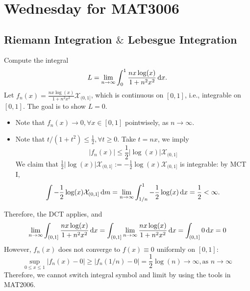 
\section{Wednesday for MAT3006}
\subsection{Riemann Integration $\&$ Lebesgue Integration}
\begin{example}
Compute the integral
\[
L=\lim_{n\to\infty}\int_0^1\frac{nx\log(x)}{1+n^2x^2}\,\mathrm{d} x.
\]
Let $f_n(x) = \frac{nx\log(x)}{1+n^2x^2}\mathcal{X}_{(0,1]}$, which is continuous on $[0,1]$, i.e., integrable on $[0,1]$.
The goal is to show $L=0$.
\begin{itemize}
\item
Note that $f_n(x)\to0,\forall x\in[0,1]$ pointwisely, as $n\to\infty$.
\item
Note that $t/(1+t^2)\le\frac{1}{2},\forall t\ge0$. Take $t=nx$, we imply
\[
|f_n(x)| \le\frac{1}{2}|\log(x)|\mathcal{X}_{(0,1]}
\]
We claim that $\frac{1}{2}|\log(x)|\mathcal{X}_{(0,1]}:=-\frac{1}{2}\log(x)\mathcal{X}_{(0,1]}$ is integrable:
by MCT I,
\[
\int-\frac{1}{2}\log(x)\mathcal{X}_{(0,1]}\,\mathrm{d} m
=
\lim_{n\to\infty}\int_{1/n}^1-\frac{1}{2}\log(x)\,\mathrm{d} x
=\frac{1}{2}<\infty.
\]
\end{itemize}
Therefore, the DCT applies, and
\[
\lim_{n\to\infty}\int_{(0,1]}\frac{nx\log(x)}{1+n^2x^2}\,\mathrm{d} x
=
\int_{(0,1]}\lim_{n\to\infty}\frac{nx\log(x)}{1+n^2x^2}\,\mathrm{d} x
=
\int_{(0,1]}0\,\mathrm{d} x= 0
\]
However, $f_n(x)$ does not converge to $f(x)\equiv0$ uniformly on $[0,1]$:
\[
\sup_{0\le x\le1}|f_n(x)-0|
\ge
|f_n(1/n) - 0|
=
\frac{1}{2}\log(n)\to\infty, \text{as $n\to\infty$}
\]
Therefore, we cannot switch integral symbol and limit by using the tools in MAT2006.
\end{example}

